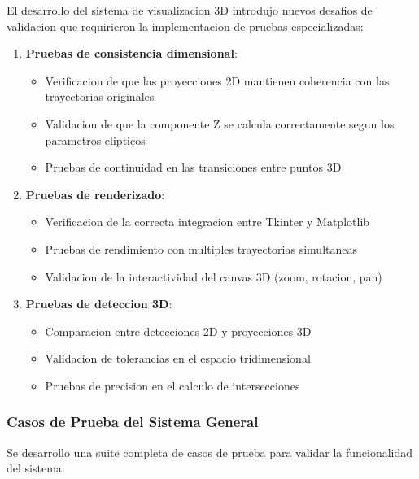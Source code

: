 \documentclass[12pt,a4paper]{article}
\begin{document}
El desarrollo del sistema de visualizacion 3D introdujo nuevos desafios de validacion que requirieron la implementacion de pruebas especializadas:

\begin{enumerate}
    \item \textbf{Pruebas de consistencia dimensional}:
    \begin{itemize}
        \item Verificacion de que las proyecciones 2D mantienen coherencia con las trayectorias originales
        \item Validacion de que la componente Z se calcula correctamente segun los parametros elipticos
        \item Pruebas de continuidad en las transiciones entre puntos 3D
    \end{itemize}
    
    \item \textbf{Pruebas de renderizado}:
    \begin{itemize}
        \item Verificacion de la correcta integracion entre Tkinter y Matplotlib
        \item Pruebas de rendimiento con multiples trayectorias simultaneas
        \item Validacion de la interactividad del canvas 3D (zoom, rotacion, pan)
    \end{itemize}
    
    \item \textbf{Pruebas de deteccion 3D}:
    \begin{itemize}
        \item Comparacion entre detecciones 2D y proyecciones 3D
        \item Validacion de tolerancias en el espacio tridimensional
        \item Pruebas de precision en el calculo de intersecciones
    \end{itemize}
\end{enumerate}

\subsubsection{Casos de Prueba del Sistema General}

Se desarrollo una suite completa de casos de prueba para validar la funcionalidad del sistema:
\end{document}
